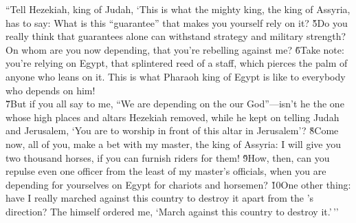 \begin{poetry}
\poeml ``Tell Hezekiah, king of Judah, `This is what the mighty king, the king of Assyria, has to say: What is this ``guarantee'' that makes you yourself rely on it? \v{5}Do you really think that guarantees alone can withstand strategy and military strength? On whom are you now depending, that you're rebelling against me? \v{6}Take note: you're relying on Egypt, that splintered reed of a staff, which pierces the palm of anyone who leans on it. This is what Pharaoh king of Egypt is like to everybody who depends on him! \\
\poeml \v{7}But if you all say to me, ``We are depending on the  our God''---isn't he the one whose high places and altars Hezekiah removed, while he kept on telling Judah and Jerusalem, `You are to worship in front of this altar in Jerusalem'? \v{8}Come now, all of you, make a bet with my master, the king of Assyria: I will give you two thousand horses, if you can furnish riders for them! \v{9}How, then, can you repulse even one officer from the least of my master's officials, when you are depending for yourselves on Egypt for chariots and horsemen? \v{10}One other thing: have I really marched against this country to destroy it apart from the 's direction? The  himself ordered me, `March against this country to destroy it.'\,''
\end{poetry}

